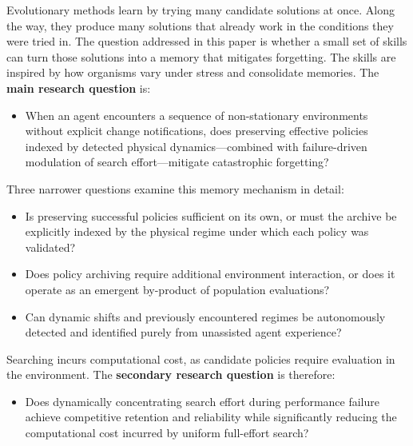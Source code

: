 Evolutionary methods learn by trying many candidate solutions at once. Along the way, they produce many solutions that already work in the conditions they were tried in. The question addressed in this paper is whether a small set of skills can turn those solutions into a memory that mitigates forgetting. The skills are inspired by how organisms vary under stress and consolidate memories. The \textbf{main research question} is:
\begin{itemize}[]
\item[\textbf{RQ1}] When an agent encounters a sequence of non-stationary environments without explicit change notifications, does preserving effective policies indexed by detected physical dynamics---combined with failure-driven modulation of search effort---mitigate catastrophic forgetting?
\end{itemize}
Three narrower questions examine this memory mechanism in detail:
\begin{itemize}[]
\item[\textbf{RQ1a}] Is preserving successful policies sufficient on its own, or must the archive be explicitly indexed by the physical regime under which each policy was validated?
\item[\textbf{RQ1b}] Does policy archiving require additional environment interaction, or does it operate as an emergent by-product of population evaluations?
\item[\textbf{RQ1c}] Can dynamic shifts and previously encountered regimes be autonomously detected and identified purely from unassisted agent experience?
\end{itemize}
Searching incurs computational cost, as candidate policies require evaluation in the environment. The \textbf{secondary research question} is therefore:
\begin{itemize}[]
\item[\textbf{RQ2}] Does dynamically concentrating search effort during performance failure achieve competitive retention and reliability while significantly reducing the computational cost incurred by uniform full-effort search?
\end{itemize}

